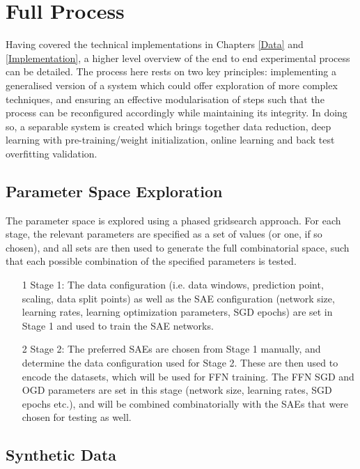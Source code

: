\documentclass[a4paper,11pt,oneside]{article}
\theoremstyle{plain}
\theoremstyle{definition}
\begin{document}
		
		
	\newpage
	\section{Full Process}\label{imp_proc}
	
	Having covered the technical implementations in Chapters \ref{Data} and \ref{Implementation}, a higher level overview of the end to end experimental process can be detailed. The process here rests on two key principles: implementing a generalised version of a system which could offer exploration of more complex techniques, and ensuring an effective modularisation of steps such that the process can be reconfigured accordingly while maintaining its integrity. In doing so, a separable system is created which brings together data reduction, deep learning with pre-training/weight initialization, online learning and back test overfitting validation.
	
	\subsection{Parameter Space Exploration}\label{proc_parameters}
	
	The parameter space is explored using a phased gridsearch approach. For each stage, the relevant parameters are specified as a set of values (or one, if so chosen), and all sets are then used to generate the full combinatorial space, such that each possible combination of the specified parameters is tested.
	
	\begin{itemize}
		\item[1] Stage 1: The data configuration (i.e. data windows, prediction point, scaling, data split points) as well as the SAE configuration (network size, learning rates, learning optimization parameters, SGD epochs) are set in Stage 1 and used to train the SAE networks.
		\item[2] Stage 2: The preferred SAEs are chosen from Stage 1 manually, and determine the data configuration used for Stage 2. These are then used to encode the datasets, which will be used for FFN training. The FFN SGD and OGD parameters are set in this stage (network size, learning rates, SGD epochs etc.), and will be combined combinatorially with the SAEs that were chosen for testing as well.
	\end{itemize}
	
	\subsection{Synthetic Data}\label{proc_synthetic}
	
\end{document}
